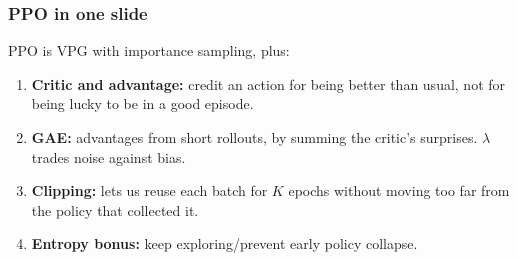 \begin{frame}
    \frametitle{PPO in one slide}
    PPO is VPG with importance sampling, plus:
    \begin{enumerate}
        \item \textbf{Critic and advantage:} credit an action for being better than usual,
        not for being lucky to be in a good episode.
        \item \textbf{GAE:} advantages from short rollouts, by summing the critic's surprises.
        $\lambda$ trades noise against bias.
        \item \textbf{Clipping:} lets us reuse each batch for $K$ epochs without
        moving too far from the policy that collected it.
        \item \textbf{Entropy bonus:} keep exploring/prevent early policy collapse.
    \end{enumerate}

\end{frame}


